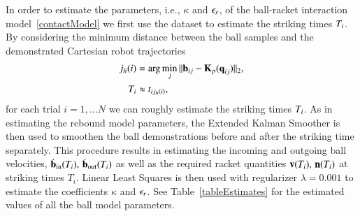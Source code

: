 %
In order to estimate the parameters, i.e., $\kappa$ and $\epsilon_r$, of the ball-racket interaction model~\eqref{contactModel} we first use the dataset to estimate the striking times $T_i$. By considering the minimum distance between the ball samples and the demonstrated Cartesian robot trajectories
%
\begin{align}
j_h(i) &= \arg\min_{j} \|\boldsymbol{\mathrm{b}}_{ij} - \boldsymbol{\mathrm{K}}_p(\boldsymbol{\mathrm{q}}_{ij})\|_2, \\
T_i &\approx t_{ij_h(i)},
\label{strikingTimeEst}
\end{align}
%
\noindent for each trial $i = 1, \ldots N$ we can roughly estimate the striking times $T_i$. As in estimating the rebound model parameters, the Extended Kalman Smoother is then used to smoothen the ball demonstrations before and after the striking time separately. This procedure results in estimating the incoming and outgoing ball velocities, $\dot{\mathbf{b}}_{\mathrm{in}}(T_i), \, \dot{\boldsymbol{\mathrm{b}}}_{\mathrm{out}}(T_i)$ as well as the required racket quantities $\boldsymbol{\mathrm{v}}(T_i), \, \boldsymbol{\mathrm{n}}(T_i)$ at striking times $T_i$. Linear Least Squares is then used with regularizer $\lambda = 0.001$ to estimate the coefficients $\kappa$ and $\epsilon_r$. See Table~\ref{tableEstimates} for the estimated values of all the ball model parameters.

